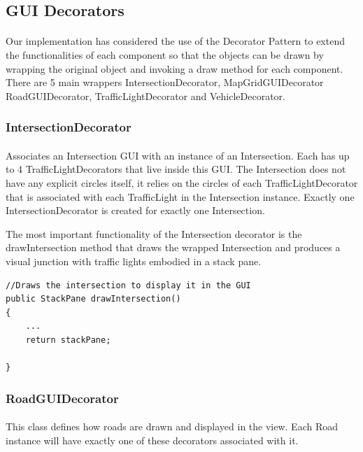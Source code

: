 \documentclass[a4paper]{article}
\begin{document}
\subsection{GUI Decorators}
\paragraph{}
Our implementation has considered the use of the Decorator Pattern to extend the functionalities of each component so that the objects can be drawn by wrapping the original object and invoking a draw method for each component. There are 5 main wrappers IntersectionDecorator, MapGridGUIDecorator RoadGUIDecorator, TrafficLightDecorator and VehicleDecorator.

\subsubsection{IntersectionDecorator}
\paragraph{}
Associates an Intersection GUI with an instance of an Intersection. Each has up to 4 TrafficLightDecorators that live inside this GUI. The Intersection does not have any explicit circles itself, it relies on the circles of each TrafficLightDecorator that is associated with each TrafficLight in the Intersection instance. Exactly one IntersectionDecorator is created for exactly one Intersection.

The most important functionality of the Intersection decorator is the drawIntersection method that draws the wrapped Intersection and produces a visual junction with traffic lights embodied in a stack pane.

\begin{lstlisting}
//Draws the intersection to display it in the GUI
public StackPane drawIntersection() 
{
	...
	return stackPane;
					
}
\end{lstlisting}

\subsubsection{RoadGUIDecorator}
\paragraph{}
This class defines how roads are drawn and displayed in the view. Each Road instance will have exactly one of these decorators associated with it.
\end{document}
